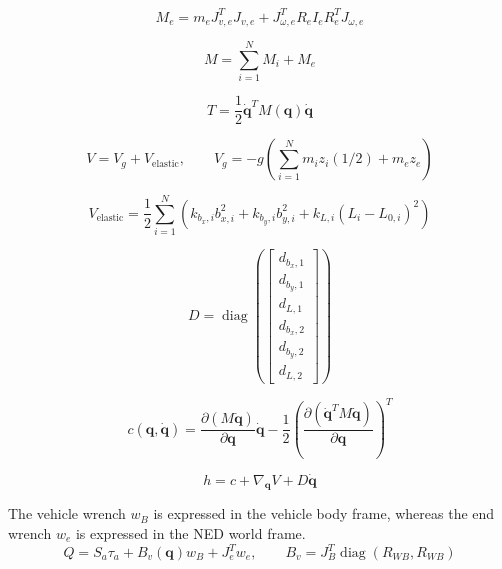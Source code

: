 \documentclass[11pt]{article}
\begin{document}
\begin{equation}
M_e=m_eJ_{v,e}^{T}J_{v,e}+J_{\omega,e}^{T}R_eI_eR_e^TJ_{\omega,e}
\end{equation}

\begin{equation}
M=\sum_{i=1}^{N}M_i+M_e\label{eq:mass-assembly}
\end{equation}

\begin{equation}
T=\frac12\dot{\boldsymbol q}^{T}M(\boldsymbol q)\dot{\boldsymbol q}
\end{equation}

\begin{equation}
V=V_g+V_{\mathrm{elastic}},\qquad V_g=-g\!\left(\sum_{i=1}^{N}m_i z_i(1/2)+m_ez_e\right)
\end{equation}

\begin{equation}
V_{\mathrm{elastic}}=\frac12\sum_{i=1}^{N}\left(k_{b_x,i}b_{x,i}^{2}+k_{b_y,i}b_{y,i}^{2}+k_{L,i}(L_i-L_{0,i})^2\right)
\end{equation}

\begin{equation}
D=\operatorname{diag}\!\left(\begin{bmatrix}d_{b_x,1}\\d_{b_y,1}\\d_{L,1}\\d_{b_x,2}\\d_{b_y,2}\\d_{L,2}\end{bmatrix}\right)
\end{equation}

\begin{equation}
c(\boldsymbol q,\dot{\boldsymbol q})=\frac{\partial(M\dot{\boldsymbol q})}{\partial\boldsymbol q}\dot{\boldsymbol q}-\frac12\left(\frac{\partial(\dot{\boldsymbol q}^{T}M\dot{\boldsymbol q})}{\partial\boldsymbol q}\right)^T
\end{equation}

\begin{equation}
h=c+\nabla_{\boldsymbol q}V+D\dot{\boldsymbol q}
\end{equation}

The vehicle wrench $w_B$ is expressed in the vehicle body frame, whereas the end wrench $w_e$ is expressed in the NED world frame.
\begin{equation}
Q=S_a\tau_a+B_v(\boldsymbol q)w_B+J_e^Tw_e,\qquad B_v=J_B^T\operatorname{diag}(R_{WB},R_{WB})
\end{equation}
\end{document}

